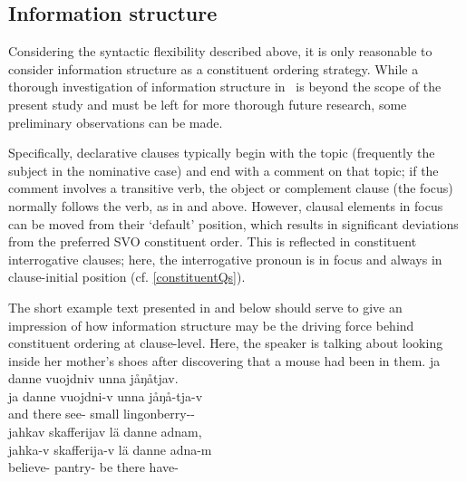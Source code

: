 \subsection{Information structure}\label{infoStructure}
Considering the syntactic flexibility described above, it is only reasonable to consider information structure as a constituent ordering strategy. 
While a thorough investigation of information structure in \PS\ is beyond the scope of the present study %
and must be left for more thorough future research, some preliminary observations can be made. %

Specifically, declarative clauses typically begin with the topic (frequently the subject in the nominative case) and end with a comment on that topic; if the comment involves a transitive verb, the object or complement clause (the focus) normally follows the verb, as in  and  above. However, clausal elements in focus can be moved from their ‘default’ position, which results in significant deviations from the %
preferred SVO constituent order. This is reflected in constituent interrogative clauses; here, the interrogative pronoun is in focus and always in clause-initial position %
(cf. \SEC\ref{constituentQs}).

The short example text presented in  and  below should serve to give an impression of how information structure may be the driving force behind constituent ordering at clause-level. Here, the speaker is talking about looking inside her mother’s shoes after discovering that a mouse had been in them.
\ea\label{mouseText4}%
\glll	ja danne vuojdniv unna jåŋåtjav.\\
	ja danne vuojdni-v unna jåŋå-tja-v\\
	and there see- small lingonberry--\\\nopagebreak
{}	
\ex\label{mouseText5}%
\glll	jahkav skafferijav lä danne adnam,\\
	jahka-v skafferija-v lä danne adna-m\\
	believe- pantry- be\BS{} there have-\\\nopagebreak
{}	
\z

